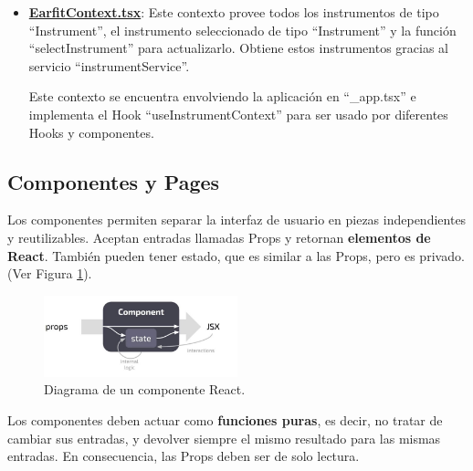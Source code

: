 \documentclass[12pt,twoside,titlepage]{report}
\begin{document}

\begin{itemize}
    \item \href{https://github.com/alberttogoca/EarFit/blob/main/src/context/EarfitContext.tsx}{\textbf{EarfitContext.tsx}}: Este contexto provee todos los instrumentos de tipo ``Instrument\text{[]}'', el instrumento seleccionado de tipo ``Instrument'' y la función ``selectInstrument'' para actualizarlo. Obtiene estos instrumentos gracias al servicio ``instrumentService''.    
    
    Este contexto se encuentra envolviendo la aplicación en ``\_app.tsx'' e implementa el Hook ``useInstrumentContext'' para ser usado por diferentes Hooks y componentes.
\end{itemize}

\subsection{Componentes y Pages}
\label{sec:componentes}

Los componentes permiten separar la interfaz de usuario en piezas independientes y reutilizables. Aceptan entradas llamadas Props y retornan \textbf{elementos de React}. También pueden tener estado, que es similar a las Props, pero es privado.
(Ver Figura \ref{fig:ReactComponent}).

\begin{figure}[H]
    \centering
    \includegraphics[width=0.5\textwidth]{React/ReactComponent}
    \caption{Diagrama de un componente React.}
    \label{fig:ReactComponent}
\end{figure}

Los componentes deben actuar como \textbf{funciones puras}, es decir, no tratar de cambiar sus entradas, y devolver siempre el mismo resultado para las mismas entradas. En consecuencia, las Props deben ser de solo lectura. 
\cite{components1}
\end{document}
